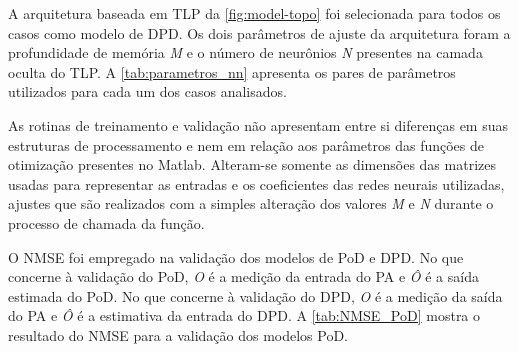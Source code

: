 A arquitetura baseada em TLP da \autoref{fig:model-topo} foi selecionada para todos os casos como modelo de DPD. Os dois parâmetros de ajuste da arquitetura foram a profundidade de memória \textit{M} e o número de neurônios \textit{N} presentes na camada oculta do TLP. A \autoref{tab:parametros_nn} apresenta os pares de parâmetros utilizados para cada um dos casos analisados.

As rotinas de treinamento e validação não apresentam entre si diferenças em suas estruturas de processamento e nem em relação aos parâmetros das funções de otimização presentes no Matlab. Alteram-se somente as dimensões das matrizes usadas para representar as entradas e os coeficientes das redes neurais utilizadas, ajustes que são realizados com a simples alteração dos valores \textit{M} e \textit{N} durante o processo de chamada da função.

O NMSE foi empregado na validação dos modelos de PoD e DPD. No que concerne à validação do PoD, \textit{O} é a medição da entrada do PA e \textit{Ô} é a saída estimada do PoD. No que concerne à validação do DPD, \textit{O} é a medição da saída do PA e \textit{Ô} é a estimativa da entrada do DPD. A \autoref{tab:NMSE_PoD} mostra o resultado do NMSE para a validação dos modelos PoD.

